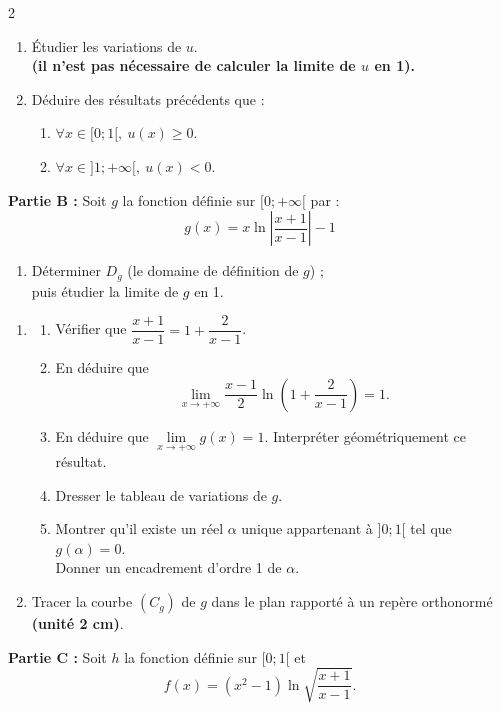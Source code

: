 \documentclass[12pt,a4paper]{article}
\begin{document}
\begin{multicols}{2}
\begin{enumerate}
    \item Étudier les variations de \( u \).\\
    \textbf{(il n’est pas nécessaire de calculer la limite de \( u \) en 1).}

    \item Déduire des résultats précédents que :
    \begin{enumerate}
        \item \( \forall x \in [0 ; 1[, \ u(x) \geq 0 \).
        \item \( \forall x \in ]1 ; +\infty[, \ u(x) < 0 \).
    \end{enumerate}
\end{enumerate}

\textbf{Partie B :} Soit \( g \) la fonction définie sur \( [0 ; +\infty[ \) par :
\[
g(x) = x \ln\left| \frac{x+1}{x-1} \right| - 1
\]

\begin{enumerate}
    \item Déterminer \( D_g \) (le domaine de définition de \( g \)) ;\\
    puis étudier la limite de \( g \) en 1.
\end{enumerate}
\begin{enumerate}
    \item
    \begin{enumerate}
        \item Vérifier que \( \dfrac{x+1}{x-1} = 1 + \dfrac{2}{x-1} \).
        \item En déduire que 
        \[
        \lim_{x \to +\infty} \dfrac{x - 1}{2} \ln\left(1 + \dfrac{2}{x - 1} \right) = 1.
        \]
        \item En déduire que \( \lim\limits_{x \to +\infty} g(x) = 1 \). Interpréter géométriquement ce résultat.
        \item Dresser le tableau de variations de \( g \).
        \item Montrer qu’il existe un réel \( \alpha \) unique appartenant à \( ]0 ; 1[ \) tel que \( g(\alpha) = 0 \).\\
        Donner un encadrement d’ordre 1 de \( \alpha \).
    \end{enumerate}

    \item Tracer la courbe \( (C_g) \) de \( g \) dans le plan rapporté à un repère orthonormé \textbf{(unité 2 cm)}.
\end{enumerate}

\textbf{Partie C :} Soit \( h \) la fonction définie sur \( [0 ; 1[ \) et
\[
f(x) = (x^2 - 1) \ln \sqrt{ \dfrac{x+1}{x-1} }.
\]


\end{multicols}
\end{document}
